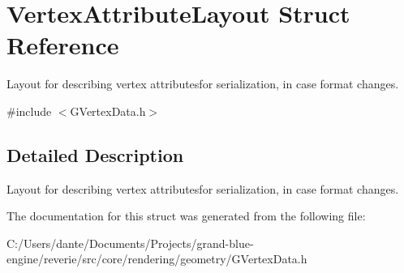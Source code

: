 \hypertarget{struct_vertex_attribute_layout}{}\section{Vertex\+Attribute\+Layout Struct Reference}
\label{struct_vertex_attribute_layout}


Layout for describing vertex attributesfor serialization, in case format changes.  




{\ttfamily \#include $<$G\+Vertex\+Data.\+h$>$}



\subsection{Detailed Description}
Layout for describing vertex attributesfor serialization, in case format changes. 

The documentation for this struct was generated from the following file\+:\begin{DoxyCompactItemize}
\item 
C\+:/\+Users/dante/\+Documents/\+Projects/grand-\/blue-\/engine/reverie/src/core/rendering/geometry/G\+Vertex\+Data.\+h\end{DoxyCompactItemize}
